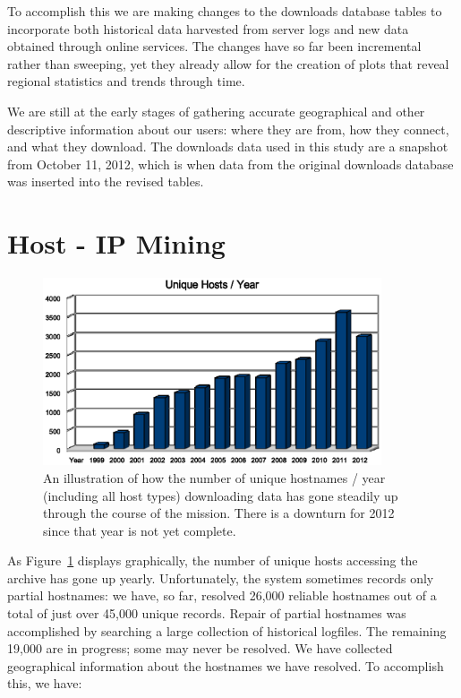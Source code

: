 To accomplish this we are making changes to the downloads database tables to 
incorporate both historical data harvested from server logs and new data obtained through online
services. The changes have so far been incremental rather than sweeping, yet they already 
allow for the creation of plots that reveal regional statistics and trends through time.

We are still at the early stages of gathering accurate geographical and other 
descriptive information about our users: where they are from, how they connect, and what they 
download. The downloads data used in this study are a snapshot from October 11, 2012, which 
is when data from the original downloads database was inserted into the revised tables.

\section{Host - IP Mining}

\begin{figure}[H]
\begin{center}
\includegraphics[width=100mm]{part6/Becker_P41/hosts_year.eps}
\end{center}
\caption{An illustration of how the number of unique hostnames / year (including all host
types) downloading data has gone steadily up through the course of the mission. There is a
downturn for 2012 since that year is not yet complete.}
\label{fig:HostsByYear}
\end{figure}

As Figure~\ref{fig:HostsByYear} displays graphically, the number of unique hosts accessing the archive
has gone up yearly. Unfortunately, the system sometimes records only partial hostnames: we have, so far, resolved 
26,000 reliable hostnames out of a total of just over 45,000 unique records. Repair of partial hostnames was 
accomplished by searching a large collection of historical logfiles. The remaining 19,000 are 
in progress; some may never be resolved. We have collected geographical information about the 
hostnames we have resolved. To accomplish this, we have:

